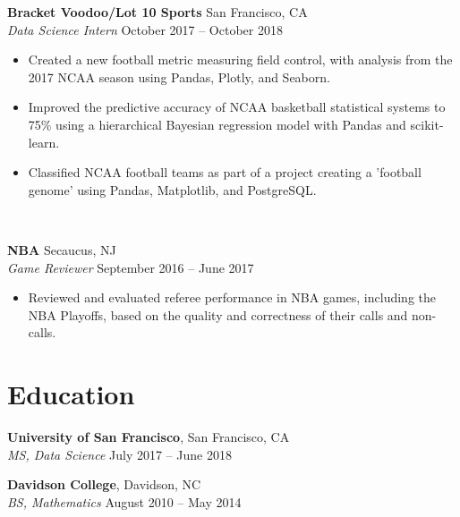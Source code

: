 \documentclass[line, margin]{res}
\begin{document}
\begin{resume}
	\textbf{Bracket Voodoo/Lot 10 Sports} \hfill{San Francisco, CA} \vspace{1mm}\\\vspace{0.5mm}%
	\textsl{Data Science Intern} \hfill {October 2017 -- October 2018}\
	\begin{itemize}
		\item Created a new football metric measuring field control, with analysis from the 2017 NCAA season using Pandas, Plotly, and Seaborn.
		\item Improved the predictive accuracy of NCAA basketball statistical systems to 75\% using a hierarchical Bayesian regression model with Pandas and scikit-learn.
		\item Classified NCAA football teams as part of a project creating a 'football genome' using Pandas, Matplotlib, and PostgreSQL.
	\end{itemize}\

	\textbf{NBA} \hfill{Secaucus, NJ} \vspace{1mm}\\\vspace{0.5mm}%
	\textsl{Game Reviewer} \hfill {September 2016 -- June 2017}\
	\begin{itemize}
		\item Reviewed and evaluated referee performance in NBA games, including the NBA Playoffs, based on the quality and correctness of their calls and non-calls.
	\end{itemize}
	
	
\section{Education}
	\textbf{University of San Francisco}, San Francisco, CA \vspace{1mm}\\\vspace{1mm}
	\textsl{MS, Data Science} \hfill {July 2017 -- June 2018}\

	\textbf{Davidson College}, Davidson, NC \vspace{1mm}\\\vspace{-1mm}
	\textsl{BS, Mathematics} \hfill {August 2010 -- May 2014}



\end{resume}
\end{document}
